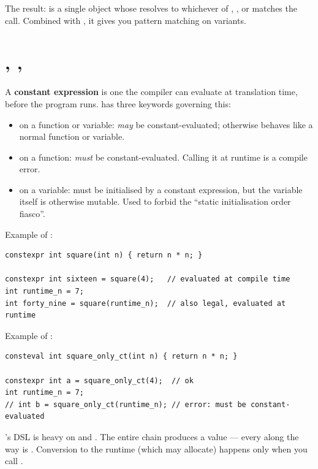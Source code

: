 The result:  is a single object whose
 resolves to whichever of , , or
 matches the call. Combined with , it gives
you pattern matching on variants.

\section{, , }
\label{sec:cpp:constexpr}

A \textbf{constant expression} is one the compiler can evaluate at
translation time, before the program runs. \cpp{} has three
keywords governing this:

\begin{itemize}[leftmargin=*]
  \item {} on a function or variable: \emph{may} be
    constant-evaluated; otherwise behaves like a normal function or
    variable.
  \item {} on a function: \emph{must} be
    constant-evaluated. Calling it at runtime is a compile error.
  \item {} on a variable: must be initialised by a
    constant expression, but the variable itself is otherwise
    mutable. Used to forbid the ``static initialisation order
    fiasco''.
\end{itemize}

Example of :

\begin{lstlisting}
constexpr int square(int n) { return n * n; }

constexpr int sixteen = square(4);   // evaluated at compile time
int runtime_n = 7;
int forty_nine = square(runtime_n);  // also legal, evaluated at runtime
\end{lstlisting}

Example of :

\begin{lstlisting}
consteval int square_only_ct(int n) { return n * n; }

constexpr int a = square_only_ct(4);  // ok
int runtime_n = 7;
// int b = square_only_ct(runtime_n); // error: must be constant-evaluated
\end{lstlisting}

\maya{}'s DSL is heavy on  and . The
entire chain  produces a
 value --- every  along the way is
. Conversion to the runtime  (which
may allocate) happens only when you call .

